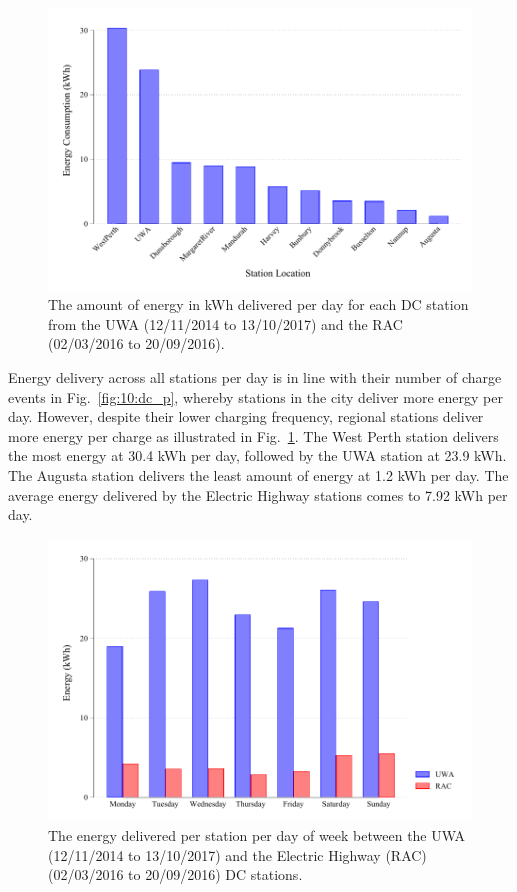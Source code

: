 \begin{figure}[H]
	\centering
	\includegraphics[width=0.8\linewidth]{dc_p_e}
	\caption[Amount of energy delivered per day for each station]{The amount of energy in kWh delivered per day for each DC station from the UWA (12/11/2014 to 13/10/2017) and the RAC (02/03/2016 to 20/09/2016).}
	\label{fig:10:dc_p_e}
\end{figure}

Energy delivery across all stations per day is in line with their number of charge events in Fig.~\ref{fig:10:dc_p}, whereby stations in the city deliver more energy per day. However, despite their lower charging frequency, regional stations deliver more energy per charge as illustrated in Fig.~\ref{fig:10:dc_p_e}. The West Perth station delivers the most energy at 30.4 kWh per day, followed by the UWA station at 23.9 kWh. The Augusta station delivers the least amount of energy at 1.2 kWh per day. The average energy delivered by the Electric Highway stations comes to 7.92 kWh per day.

\begin{figure}[H]
	\centering
	\includegraphics[width=0.8\linewidth]{uwarac_e}
	\caption[Energy delivered per station per day of week]{The energy delivered per station per day of week between the UWA (12/11/2014 to 13/10/2017) and the Electric Highway (RAC) (02/03/2016 to 20/09/2016) DC stations.}
	\label{fig:10:uwarac_e}
\end{figure}


